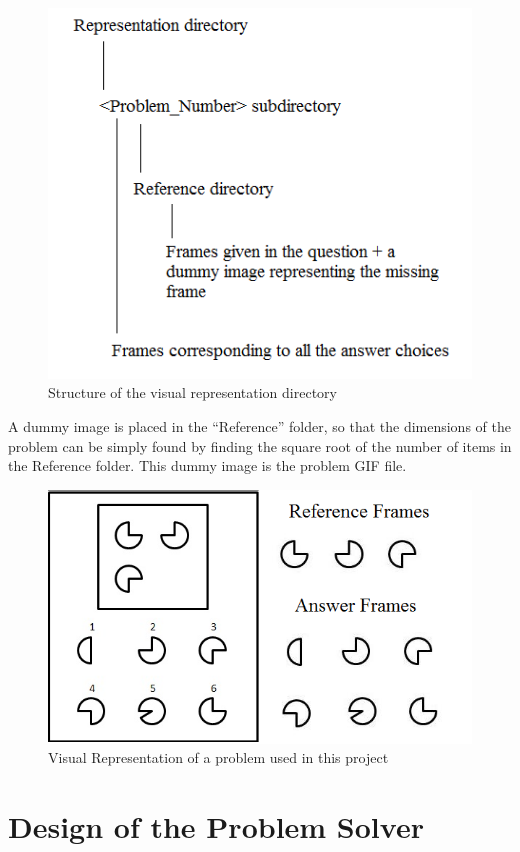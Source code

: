 \documentclass[10pt, letter]{article}
\begin{document}
\begin{figure}[h!]
  \centering
    \includegraphics[scale = 0.6]{Images/Fig2}
    \caption{Structure of the visual representation directory}
  \label{fig2}
\end{figure}

A dummy image is placed in the ``Reference'' folder, so that the dimensions of the problem can be simply found by finding the square root of the number of items in the Reference folder. This dummy image is the problem GIF file.

\begin{figure}[h!]
  \centering
    \includegraphics[scale = 0.5]{Images/Fig1}
    \caption{Visual Representation of a problem used in this project}
  \label{fig1}
\end{figure}

\section{Design of the Problem Solver}
\end{document}
